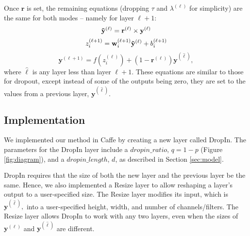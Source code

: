 \documentclass[10pt,twocolumn,letterpaper]{article}
\newcommand{\dropin}{DropIn }
\newcommand{\dropinNS}{DropIn}
\begin{document}
Once $ \mathbf{r} $  is set, the remaining equations (dropping $\tau$ and $\lambda^{(\ell)}$ for simplicity) are the same for both modes -- namely for layer $ {\ell+1}$:
\begin{equation}
\mathbf{\tilde{y}}^{(\ell)} = \mathbf{r}^{(\ell)} \times \mathbf{y}^{(\ell)}  \\
\end{equation}
\begin{equation}
z^{(\ell+1)}_i  = \mathbf{w}^{(\ell+1)}_i \mathbf{\tilde{y}}^{(\ell)} + b_i^{(\ell+1)} \\
\end{equation}
\begin{equation}
\mathbf{y}^{(\ell+1)} = f ( z_i^{(\ell)} ) + ( 1 - \mathbf{r}^{(\ell)} )  \mathbf{y}^{(\hat{\ell})},
\end{equation}
where $ \hat{\ell} $ is any layer less than layer $ {\ell+1}$.
These equations are similar to those for dropout, except instead of some of the outputs being zero, they are set to the values from a previous layer, $ \mathbf{y}^{(\hat{\ell})} $.


\subsection{Implementation}
\label{sec:code}

We implemented our method in Caffe \cite{Caffe14} by creating a new layer called \dropinNS.
The parameters for the \dropin layer include a $dropin\_ratio$, $ q = 1 - p$ (Figure \ref{fig:diagram}), and a $dropin\_length$, $d$, as described in Section \ref{sec:model}.

\dropin requires that the size of both the new layer and the previous layer be the same.
Hence, we also implemented a Resize layer to allow reshaping a layer's output to a user-specified size.
The Resize layer modifies its input, which is $ \mathbf{y}^{(\hat{\ell})},$ into a user-specified height, width, and number of channels/filters. 
The Resize layer allows \dropin to work with any two layers, even when the sizes of $ \mathbf{y}^{(\ell)}$ and $ \mathbf{y}^{(\hat{\ell})} $ are different.
\end{document}
